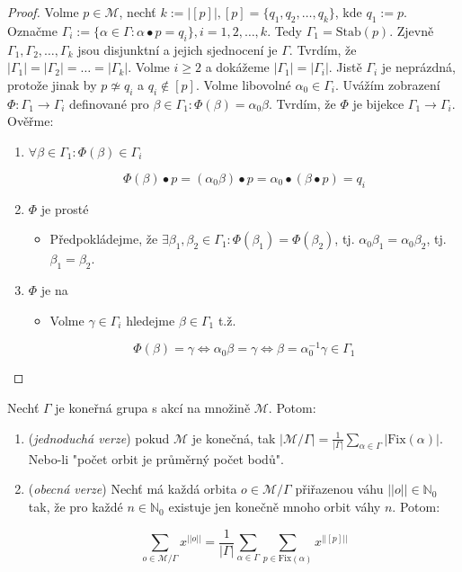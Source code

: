 \begin{proof}
	Volme $p \in \mathcal{M}$, nechť $k := |[p]|, [p] = \{q_{1},q_{2},\dots,q_{k}\}$, kde $q_{1}:=p$. Označme $\Gamma_{i} := \{\alpha \in \Gamma: \alpha \bullet p = q_{i}\}, i = 1,2,\dots,k$. Tedy $\Gamma_{1} = \text{Stab}(p)$. Zjevně $\Gamma_{1}, \Gamma_{2}, \dots , \Gamma_{k}$ jsou disjunktní a jejich sjednocení je $\Gamma$. Tvrdím, že $|\Gamma_{1}| = |\Gamma_{2}| = \dots = |\Gamma_{k}|$. Volme $i\geq 2$ a dokážeme $|\Gamma_{1}| = |\Gamma_{i}|$. Jistě $\Gamma_{i}$ je neprázdná, protože jinak by $p \not\simeq q_{i}$ a $q_{i} \notin [p]$. Volme libovolné $\alpha_{0} \in \Gamma_{i}$. Uvážím zobrazení $\Phi : \Gamma_{1} \to \Gamma_{i}$ definované pro $\beta \in \Gamma_{1}: \Phi(\beta) = \alpha_{0} \beta$. Tvrdím, že $\Phi$ je bijekce $\Gamma_{1} \to \Gamma_{i}$. Ověřme:
	
	\begin{enumerate}
		\item $\forall \beta \in \Gamma_{1} : \Phi(\beta) \in \Gamma_{i}$
		
		$$
		\Phi(\beta) \bullet p = (\alpha_{0}\beta) \bullet p = \alpha_{0} \bullet (\beta \bullet p) = q_{i}
		$$
		
		\item $\Phi$ je prosté
		\begin{itemize}
			\item Předpokládejme, že $\exists \beta_{1},\beta_{2} \in \Gamma_{1}: \Phi(\beta_{1}) = \Phi(\beta_{2})$, tj. $\alpha_{0} \beta_{1} = \alpha_{0}\beta_{2}$, tj. $\beta_{1} = \beta_{2}$.
		\end{itemize}
		\item $\Phi$ je na
		\begin{itemize}
			\item Volme $\gamma \in \Gamma_{i}$ hledejme $\beta \in \Gamma_{1}$ t.ž.
		\end{itemize}
		
		$$
		\Phi(\beta) = \gamma \Leftrightarrow \alpha_{0} \beta = \gamma \Leftrightarrow \beta = \alpha_{0}^{-1} \gamma \in \Gamma_{1}
		$$
	\end{enumerate}
\end{proof}

\begin{veta}
	Nechť $\Gamma$ je koneřná grupa s akcí na množině $\mathcal{M}$. Potom:
	
	\begin{enumerate}
		\item (\textit{jednoduchá verze}) pokud $\mathcal{M}$ je konečná, tak $|\mathcal{M}/\Gamma| = \frac{1}{|\Gamma| }\sum_{\alpha \in \Gamma} |\text{Fix}(\alpha)|$. Nebo-li "počet orbit je průměrný počet bodů".
		\item (\textit{obecná verze}) Nechť má každá orbita $o \in \mathcal{M}/\Gamma$ přiřazenou váhu $||o|| \in \mathbb{N}_{0}$ tak, že pro každé $n \in \mathbb{N}_{0}$ existuje jen konečně mnoho orbit váhy $n$. Potom:
		
		$$
		\sum_{o \in \mathcal{M}/\Gamma}x^{||o||} = \frac{1}{|\Gamma|}\sum_{\alpha \in \Gamma} \sum_{p \in \text{Fix}(\alpha)} x^{||[p]||}
		$$
	\end{enumerate}
\end{veta}

